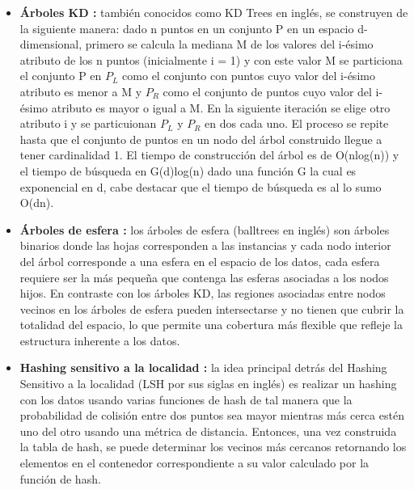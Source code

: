 \begin{itemize}
\item \textbf{Árboles KD \cite{shakhnarovich2006nearest,bentley1975multidimensional}:}
también conocidos como KD Trees en inglés, se construyen de la siguiente manera: dado n puntos en un conjunto P en un espacio d-dimensional, primero se calcula la mediana M de los valores del i-ésimo atributo de los n puntos (inicialmente i = 1) y con este valor M se particiona el conjunto P en $P_L$ como el conjunto con puntos cuyo valor del i-ésimo atributo es menor a M y $P_R$ como el conjunto de puntos cuyo valor del i-ésimo atributo es mayor o igual a M. En la siguiente iteración se elige otro atributo i y se particuionan $P_L$ y $P_R$ en dos cada uno. El proceso se repite hasta que el conjunto de puntos en un nodo del árbol construido llegue a tener cardinalidad 1. El tiempo de construcción del árbol es de O(nlog(n)) y el tiempo de búsqueda en G(d)log(n) dado una función G la cual es exponencial en d, cabe destacar que el tiempo de búsqueda es al lo sumo O(dn).

\item \textbf{Árboles de esfera \cite{shakhnarovich2006nearest,omohundro1989five,uhlmann1991satisfying}:}
los árboles de esfera (balltrees en inglés) son árboles binarios donde las hojas corresponden a las instancias y cada nodo interior del árbol corresponde a una esfera en el espacio de los datos, cada esfera requiere ser la más pequeña que contenga las esferas asociadas a los nodos hijos. En contraste con los árboles KD, las regiones asociadas entre nodos vecinos en los árboles de esfera pueden intersectarse y no tienen que cubrir la totalidad del espacio, lo que permite una cobertura más flexible que refleje la estructura inherente a los datos.

\item \textbf{Hashing sensitivo a la localidad \cite{shakhnarovich2006nearest,indyk2004nearest}:}
la idea principal detrás del Hashing Sensitivo a la localidad (LSH por sus siglas en inglés) es realizar un hashing con los datos usando varias funciones de hash de tal manera que la probabilidad de colisión entre dos puntos sea mayor mientras más cerca estén uno del otro usando una métrica de distancia. Entonces, una vez construida la tabla de hash, se puede determinar los vecinos más cercanos retornando los elementos en el contenedor correspondiente a su valor calculado por la función de hash.
\end{itemize}

